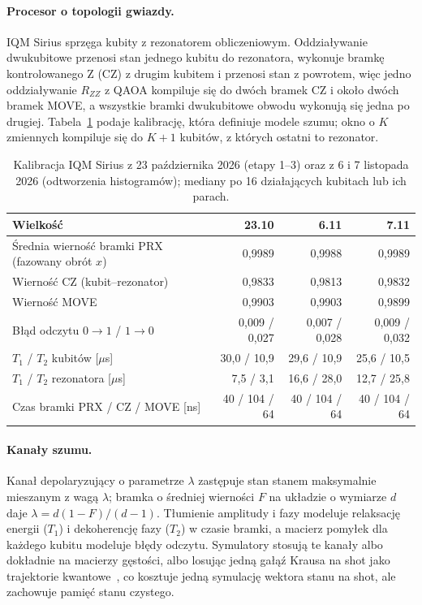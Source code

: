 \documentclass{scspaperproc}
\begin{document}
\paragraph{Procesor o topologii gwiazdy.}
IQM Sirius sprzęga kubity z rezonatorem obliczeniowym. Oddziaływanie
dwukubitowe przenosi stan jednego kubitu do rezonatora, wykonuje bramkę
kontrolowanego Z (CZ) z drugim kubitem i przenosi stan z powrotem, więc jedno
oddziaływanie $R_{ZZ}$ z QAOA kompiluje się do dwóch bramek CZ i około dwóch
bramek MOVE, a wszystkie bramki dwukubitowe obwodu wykonują się jedna po
drugiej. Tabela~\ref{tab:calib} podaje kalibrację, która definiuje modele
szumu; okno o $K$ zmiennych kompiluje się do $K + 1$ kubitów, z których
ostatni to rezonator.

\begin{table}[t]
\caption{Kalibracja IQM Sirius z 23 października 2026 (etapy 1--3) oraz z 6
i 7 listopada 2026 (odtworzenia histogramów); mediany po 16 działających
kubitach lub ich parach.}
\label{tab:calib}
\centering
\small
\begin{tabular}{lrrr}
\toprule
Wielkość & 23.10 & 6.11 & 7.11 \\
\midrule
Średnia wierność bramki PRX (fazowany obrót $x$) & 0,9989 & 0,9988 & 0,9989 \\
Wierność CZ (kubit--rezonator) & 0,9833 & 0,9813 & 0,9832 \\
Wierność MOVE & 0,9903 & 0,9903 & 0,9899 \\
Błąd odczytu $0\!\to\!1$ / $1\!\to\!0$ & 0,009 / 0,027 & 0,007 / 0,028 & 0,009 / 0,032 \\
$T_1$ / $T_2$ kubitów [$\mu$s] & 30,0 / 10,9 & 29,6 / 10,9 & 25,6 / 10,5 \\
$T_1$ / $T_2$ rezonatora [$\mu$s] & 7,5 / 3,1 & 16,6 / 28,0 & 12,7 / 25,8 \\
Czas bramki PRX / CZ / MOVE [ns] & 40 / 104 / 64 & 40 / 104 / 64 & 40 / 104 / 64 \\
\bottomrule
\end{tabular}
\end{table}

\paragraph{Kanały szumu.}
Kanał depolaryzujący o parametrze $\lambda$ zastępuje stan stanem maksymalnie
mieszanym z wagą $\lambda$; bramka o średniej wierności $F$ na układzie
o wymiarze $d$ daje $\lambda = d(1 - F)/(d - 1)$. Tłumienie amplitudy i fazy
modeluje relaksację energii ($T_1$) i dekoherencję fazy ($T_2$) w czasie
bramki, a macierz pomyłek dla każdego kubitu modeluje błędy odczytu.
Symulatory stosują te kanały albo dokładnie na macierzy gęstości, albo losując
jedną gałąź Krausa na shot jako trajektorie kwantowe~\cite{dalibard1992mcwf},
co kosztuje jedną symulację wektora stanu na shot, ale zachowuje pamięć stanu
czystego.
\end{document}

